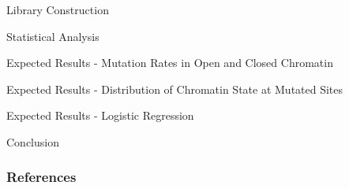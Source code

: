 \documentclass{beamer}
\begin{document}
\begin{frame}{Library Construction}
\end{frame}

\begin{frame}{Statistical Analysis}
\end{frame}

\begin{frame}{Expected Results - Mutation Rates in Open and Closed Chromatin}
\end{frame}

\begin{frame}{Expected Results - Distribution of Chromatin State at Mutated Sites}
\end{frame}

\begin{frame}{Expected Results - Logistic Regression}
\end{frame}

\begin{frame}{Conclusion}
\end{frame}

\begin{frame}[t, allowframebreaks]
\frametitle{References}
\printbibliography
\end{frame}
\end{document}
